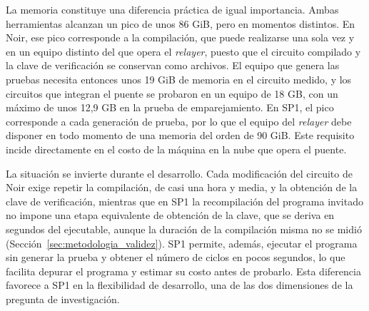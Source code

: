 La memoria constituye una diferencia práctica de igual importancia. Ambas herramientas alcanzan un
pico de unos 86 GiB, pero en momentos distintos. En Noir, ese pico corresponde a la compilación,
que puede realizarse una sola vez y en un equipo distinto del que opera el \textit{relayer},
puesto que el circuito compilado y la clave de verificación se conservan como archivos. El equipo
que genera las pruebas necesita entonces unos 19 GiB de memoria en el circuito medido, y los
circuitos que integran el puente se probaron en un equipo de 18 GB, con un máximo de unos 12,9 GB
en la prueba de emparejamiento. En SP1, el pico corresponde a
cada generación de prueba, por lo que el equipo del \textit{relayer} debe disponer en todo momento
de una memoria del orden de 90 GiB. Este requisito incide directamente en el costo de la máquina en
la nube que opera el puente.

La situación se invierte durante el desarrollo. Cada modificación del circuito de Noir exige
repetir la compilación, de casi una hora y media, y la obtención de la clave de verificación,
mientras que en SP1 la recompilación del programa invitado no impone una etapa equivalente de
obtención de la clave, que se deriva en segundos del ejecutable, aunque la duración de la
compilación misma no se midió (Sección~\ref{sec:metodologia_validez}). SP1 permite,
además, ejecutar el programa sin generar la prueba y obtener el número de ciclos en pocos segundos,
lo que facilita depurar el programa y estimar su costo antes de probarlo. Esta diferencia favorece a
SP1 en la flexibilidad de desarrollo, una de las dos dimensiones de la pregunta de investigación.

